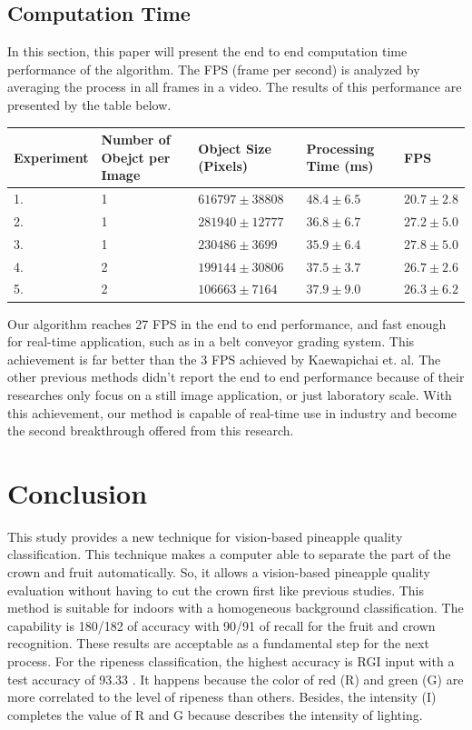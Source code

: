 \documentclass[11pt]{article}
\begin{document}
\begin{linenumbers}
\subsection{Computation Time}
In this section, this paper will present the end to end computation time performance of the algorithm. The FPS (frame per second) is analyzed by averaging the process in all frames in a video. The results of this performance are presented by the table below.

\begin{tabular}{ p{1.7cm} p{1.7cm} p{3.3cm} p{1.8cm} p{1.8cm}}
	\hline
	Experiment & Number of Obejct per Image & Object Size (Pixels) & Processing Time (ms) & FPS\\
	\hline
	1.& 1 & $616797\pm38808$ & $48.4\pm6.5$ & $20.7\pm2.8$\\ 
	2.& 1 & $281940\pm12777$ & $36.8\pm6.7$ & $27.2\pm5.0$\\
	3.& 1 & $230486\pm3699$  & $35.9\pm6.4$ & $27.8\pm5.0$\\
	4.& 2 & $199144\pm30806$ & $37.5\pm3.7$ & $26.7\pm2.6$\\
	5.& 2 & $106663\pm7164$  & $37.9\pm9.0$ & $26.3\pm6.2$\\
	\hline
\end{tabular}

Our algorithm reaches 27 FPS in the end to end performance, and fast enough for real-time application, such as in a belt conveyor grading system. This achievement is far better than the 3 FPS achieved by Kaewapichai et. al. The other previous methods didn't report the end to end performance because of their researches only focus on a still image application, or just laboratory scale. With this achievement, our method is capable of real-time use in industry and become the second breakthrough offered from this research.

\section{Conclusion}
This study provides a new technique for vision-based pineapple quality classification. This technique makes a computer able to separate the part of the crown and fruit automatically. So, it allows a vision-based pineapple quality evaluation without having to cut the crown first like previous studies. This method is suitable for indoors with a homogeneous background classification. The capability is 180/182 of accuracy with 90/91 of recall for the fruit and crown recognition. These results are acceptable as a fundamental step for the next process. For the ripeness classification, the highest accuracy is RGI input with a test accuracy of 93.33 \text {\%}. It happens because the color of red (R) and green (G) are more correlated to the level of ripeness than others. Besides, the intensity (I) completes the value of R and G because describes the intensity of lighting.



\end{linenumbers}
\end{document}
